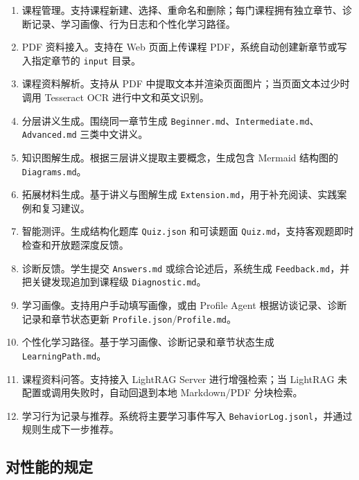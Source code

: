 \documentclass[UTF8,fontset=windows,zihao=-4,openany]{ctexrep}
\begin{document}
\begin{enumerate}
  \item 课程管理。支持课程新建、选择、重命名和删除；每门课程拥有独立章节、诊断记录、学习画像、行为日志和个性化学习路径。
  \item PDF 资料接入。支持在 Web 页面上传课程 PDF，系统自动创建新章节或写入指定章节的 \texttt{input} 目录。
  \item 课程资料解析。支持从 PDF 中提取文本并渲染页面图片；当页面文本过少时调用 Tesseract OCR 进行中文和英文识别。
  \item 分层讲义生成。围绕同一章节生成 \texttt{Beginner.md}、\texttt{Intermediate.md}、\texttt{Advanced.md} 三类中文讲义。
  \item 知识图解生成。根据三层讲义提取主要概念，生成包含 Mermaid 结构图的 \texttt{Diagrams.md}。
  \item 拓展材料生成。基于讲义与图解生成 \texttt{Extension.md}，用于补充阅读、实践案例和复习建议。
  \item 智能测评。生成结构化题库 \texttt{Quiz.json} 和可读题面 \texttt{Quiz.md}，支持客观题即时检查和开放题深度反馈。
  \item 诊断反馈。学生提交 \texttt{Answers.md} 或综合论述后，系统生成 \texttt{Feedback.md}，并把关键发现追加到课程级 \texttt{Diagnostic.md}。
  \item 学习画像。支持用户手动填写画像，或由 Profile Agent 根据访谈记录、诊断记录和章节状态更新 \texttt{Profile.json}/\texttt{Profile.md}。
  \item 个性化学习路径。基于学习画像、诊断记录和章节状态生成 \texttt{LearningPath.md}。
  \item 课程资料问答。支持接入 LightRAG Server 进行增强检索；当 LightRAG 未配置或调用失败时，自动回退到本地 Markdown/PDF 分块检索。
  \item 学习行为记录与推荐。系统将主要学习事件写入 \texttt{BehaviorLog.jsonl}，并通过规则生成下一步推荐。
\end{enumerate}

\subsection{对性能的规定}
\end{document}
